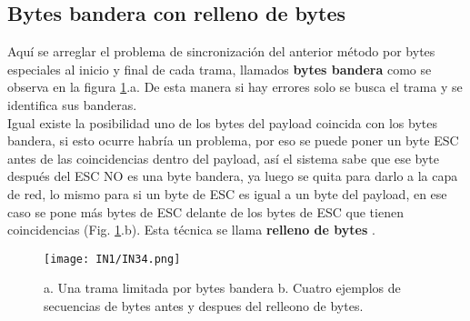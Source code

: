 \documentclass[
	12pt, %
	fleqn, %
	a4paper, %
	oneside, %
]{LegrandOrangeBook}
\begin{document}
\subsection{Bytes bandera con relleno de bytes}
Aquí se arreglar el problema de sincronización del anterior método por bytes especiales al inicio y final de cada trama, llamados \textbf{bytes bandera} como se observa en la figura \ref{fig: bytes bandera}.a. De esta manera si hay errores solo se busca el trama y se identifica sus banderas.\\
Igual existe la posibilidad uno de los bytes del payload coincida con los bytes bandera, si esto ocurre habría un problema, por eso se puede poner un byte ESC antes de las coincidencias dentro del payload, así el sistema sabe que ese byte después del ESC NO es una byte bandera, ya luego se quita para darlo a la capa de red, lo mismo para si un byte de ESC es igual a un byte del payload, en ese caso se pone más bytes de ESC delante de los bytes de ESC que tienen coincidencias (Fig. \ref{fig: bytes bandera}.b). Esta técnica se llama \textbf{relleno de bytes} .
\begin{figure}[]
\centering
\texttt{[image: IN1/IN34.png]}
\caption{a. Una trama limitada por bytes bandera b. Cuatro ejemplos de secuencias de bytes antes y despues del relleono de bytes.}
\label{fig: bytes bandera}
\end{figure}
\end{document}
